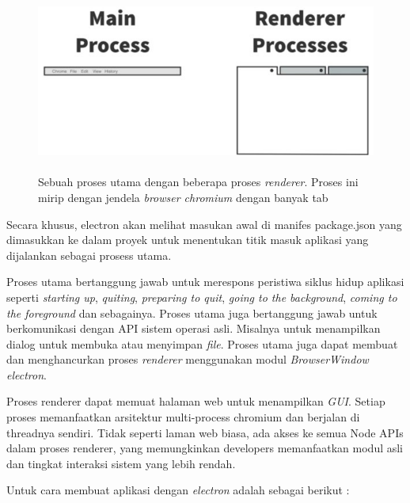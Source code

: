 \begin{figure}[H]
    \centering
    \includegraphics[width=12cm, height=6cm]{Gambar/Rendered Processes.jpg}
    \caption{Sebuah proses utama dengan beberapa proses \textit{renderer}. Proses ini mirip dengan jendela \textit{browser chromium} dengan banyak tab}
    \label{fig:gambar15}
\end{figure}

Secara khusus, electron akan melihat masukan awal di manifes package.json yang dimasukkan ke dalam proyek untuk menentukan titik masuk aplikasi yang dijalankan sebagai prosess utama.

Proses utama bertanggung jawab untuk merespons peristiwa siklus hidup aplikasi seperti \textit{starting up}, \textit{quiting}, \textit{preparing to quit}, \textit{going to the background}, \textit{coming to the foreground} dan sebagainya. Proses utama juga bertanggung jawab untuk berkomunikasi dengan API sistem operasi asli. Misalnya untuk menampilkan dialog untuk membuka atau menyimpan \textit{file}. Proses utama juga dapat membuat dan menghancurkan proses \textit{renderer} menggunakan modul \textit{BrowserWindow} \textit{electron}.

Proses renderer dapat memuat halaman web untuk menampilkan \textit{GUI}. Setiap proses memanfaatkan arsitektur multi-process chromium dan berjalan di threadnya sendiri. Tidak seperti laman web biasa, ada akses ke semua Node APIs dalam proses renderer, yang memungkinkan developers memanfaatkan modul asli dan tingkat interaksi sistem yang lebih rendah. 

Untuk cara membuat aplikasi dengan \textit{electron} adalah sebagai berikut :

